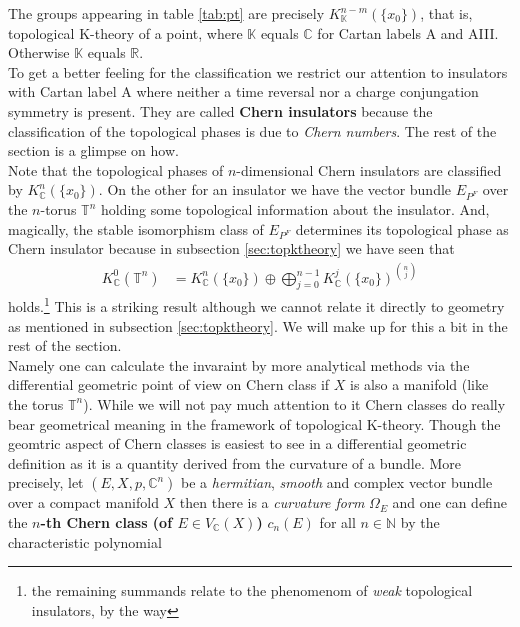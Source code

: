 The groups appearing in table \ref{tab:pt} are precisely $K_{\mathbb{K}}^{n-m}(\lbrace x_{0} \rbrace)$, that is, topological K-theory of a point, where $\mathbb{K}$ equals $\mathbb{C}$ for Cartan labels A and AIII. Otherwise $\mathbb{K}$ equals $\mathbb{R}$.
\\
To get a better feeling for the classification we restrict our attention to insulators with Cartan label A where neither a time reversal nor a charge conjungation symmetry is present. They are called \textbf{Chern insulators} because the classification of the topological phases is due to \textit{Chern numbers}. The rest of the section is a glimpse on how.
\\
Note that the topological phases of $n$-dimensional Chern insulators are classified by $K_{\mathbb{C}}^{n}(\lbrace x_{0} \rbrace)$. On the other for an insulator we have the vector bundle $E_{P^{F}}$ over the $n$-torus $\mathbb{T}^{n}$ holding some topological information about the insulator. And, magically, the stable isomorphism class of $E_{P^{F}}$ determines its topological phase as Chern insulator because in subsection \ref{sec:topktheory} we have seen that
\begin{align*}
  K_{\mathbb{C}}^{0}(\mathbb{T}^{n})
  &=
  K_{\mathbb{C}}^{n}(\lbrace x_{0} \rbrace)
  \oplus
  \bigoplus_{j=0}^{n-1}
  K_{\mathbb{C}}^{j}(\lbrace x_{0} \rbrace)^{\binom{n}{j}}
\end{align*}
holds.\footnote{the remaining summands relate to the phenomenom of \textit{weak} topological insulators, by the way}  This is a striking result although we cannot relate it directly to geometry as mentioned in subsection \ref{sec:topktheory}. We will make up for this a bit in the rest of the section. 
\\
Namely one can calculate the invaraint by more analytical methods via the differential geometric point of view on Chern class if $X$ is also a manifold (like the torus $\mathbb{T}^{n}$). While we will not pay much attention to it Chern classes do really bear geometrical meaning in the framework of topological K-theory. Though the geomtric aspect of Chern classes is easiest to see in a differential geometric definition as it is a quantity derived from the curvature of a bundle. More precisely, let $(E,X,p,\mathbb{C}^{n})$ be a \textit{hermitian}, \textit{smooth} and complex vector bundle over a compact manifold $X$ then there is a \textit{curvature form} $\Omega_{E}$ and one can define the \textbf{$n$-th Chern class (of $E \in V_{\mathbb{C}}(X)$)} $c_{n}(E)$ for all $n \in \mathbb{N}$ by the characteristic polynomial
